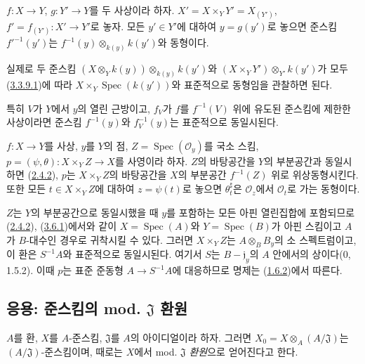 \begin{proposition}
\label{I.3.6.4-ko}
$f:X\to Y$, $g:Y'\to Y$를 두 사상이라 하자. $X'=X\times_Y Y'
=X_{(Y')}$, $f'=f_{(Y')}:X'\to Y'$로 놓자. 모든 $y'\in Y'$에
대하여 $y=g(y')$로 놓으면 준스킴 $f'^{-1}(y')$는
$f^{-1}(y)\otimes_{k(y)}k(y')$와 동형이다.
\end{proposition}

실제로 두 준스킴
$(X\otimes_Y k(y))\otimes_{k(y)}k(y')$와
$(X\times_Y Y')\otimes_{Y'}k(y')$가 모두
(\hyperref[I.3.3.9.1-ko]{3.3.9.1})에 따라
$X\times_Y\operatorname{Spec}(k(y'))$와 표준적으로 동형임을
관찰하면 된다.

특히 $V$가 $Y$에서 $y$의 열린 근방이고, $f_V$가 $f$를
$f^{-1}(V)$ 위에 유도된 준스킴에 제한한 사상이라면 준스킴 $f^{-1}(y)$와
$f_V^{-1}(y)$는 표준적으로 동일시된다.

\begin{proposition}[3.6.5]
\label{I.3.6.5-ko}
$f:X\to Y$를 사상, $y$를 $Y$의 점,
$Z=\operatorname{Spec}(\mathscr{O}_y)$를 국소 스킴,
$p=(\psi,\theta):X\times_Y Z\to X$를 사영이라 하자. $Z$의
바탕공간을 $Y$의 부분공간과 동일시하면
(\hyperref[I.2.4.2-ko]{2.4.2}), $p$는 $X\times_Y Z$의 바탕공간을
$X$의 부분공간 $f^{-1}(Z)$ 위로 위상동형시킨다. 또한 모든
$t\in X\times_Y Z$에 대하여 $z=\psi(t)$로 놓으면
$\theta_t^\sharp$은 $\mathscr{O}_z$에서 $\mathscr{O}_t$로 가는
동형이다.
\end{proposition}

$Z$는 $Y$의 부분공간으로 동일시했을 때 $y$를 포함하는 모든 아핀
열린집합에 포함되므로(\hyperref[I.2.4.2-ko]{2.4.2}),
(\hyperref[I.3.6.1-ko]{3.6.1})에서와 같이
$X=\operatorname{Spec}(A)$와 $Y=\operatorname{Spec}(B)$가 아핀
스킴이고 $A$가 $B$-대수인 경우로 귀착시킬 수 있다. 그러면
$X\times_Y Z$는 $A\otimes_B B_y$의 소 스펙트럼이고, 이 환은
$S^{-1}A$와 표준적으로 동일시된다. 여기서 $S$는
$B-\mathfrak{j}_y$의 $A$ 안에서의 상이다(0, 1.5.2). 이때 $p$는
표준 준동형 $A\to S^{-1}A$에 대응하므로 명제는
(\hyperref[I.1.6.2-ko]{1.6.2})에서 따른다.

\subsection{응용: 준스킴의 mod.
\texorpdfstring{$\mathfrak{J}$ 환원\protect\footnotemark}{J 환원}}
\label{subsection:I.3.7-ko}
\label{I.3.7-ko}

\begin{env}[3.7.1]
\label{I.3.7.1-ko}
$A$를 환, $X$를 $A$-준스킴, $\mathfrak{J}$를 $A$의 아이디얼이라 하자.
그러면 $X_0=X\otimes_A(A/\mathfrak{J})$는
$(A/\mathfrak{J})$-준스킴이며, 때로는 $X$에서 mod. $\mathfrak{J}$
\emph{환원}으로 얻어진다고 한다.
\end{env}

